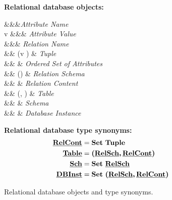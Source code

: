 \begin{figure}

\textbf{Relational database objects:}
\begin{syntax}
\synDef \vAtt \attnametype &&&\textit{Attribute Name}\\
\synDef v {} &&& \textit{Attribute Value}\\
\synDef \vRel \relnametype &&& \textit{Relation Name}\\
\synDef {\underline{\vTuple}} { \tupletype} &\eqq& {(\vi v \numAtts)} & \textit{Tuple}\\
\synDef {\underline{\vAttList}} {\settype \attnametype} &\eqq& 
 & \textit{Ordered Set of Attributes}\\
\synDef \pRelSch \pRelSchSet &\eqq& \vRel\left(\underline{\vAttList}\right) & \textit{Relation Schema}\\
\synDef \pRelCont \pRelContSet &\eqq&  & \textit{Relation Content}\\
\synDef \pTab \pTabSet &\eqq& \left(\pRelSch, \pRelCont\right) & \textit{Table}\\
\synDef \pSch \pSchSet  &\eqq&  & \textit{Schema}\\
\synDef \pInst \pInstSet &\eqq&  & \textit{Database Instance}\\
\end{syntax}

\medskip
\textbf{Relational database type synonyms:}
\begin{alignat*}{1}
\pRelContSet &= {\settype \tupletype}\\
\pTabSet &= \typepair{\pRelSchSet} {\pRelContSet}\\
\pSchSet &= \settype {\underline \relschtype}\\
{\underline \dbinsttype} &= \settype {\typepair \pRelSchSet {\underline \relconttype}}
\end{alignat*}
\caption[Relational databases definition]{Relational database objects and type synonyms.}
\label{fig:rdb-def}
\end{figure} 
